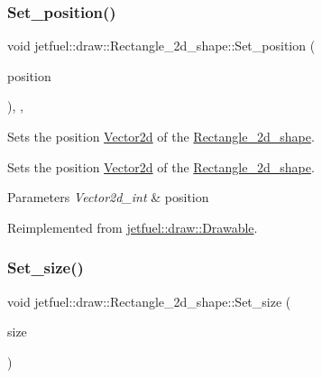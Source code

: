 \subsubsection{\texorpdfstring{Set\+\_\+position()}{Set\_position()}}
{\footnotesize\ttfamily void jetfuel\+::draw\+::\+Rectangle\+\_\+2d\+\_\+shape\+::\+Set\+\_\+position (\begin{DoxyParamCaption}\item[{const \hyperlink{classjetfuel_1_1draw_1_1Vector2d}{Vector2d\+\_\+int}}]{position }\end{DoxyParamCaption})\hspace{0.3cm}{\ttfamily [inline]}, {\ttfamily [override]}, {\ttfamily [virtual]}}



Sets the position \hyperlink{classjetfuel_1_1draw_1_1Vector2d}{Vector2d} of the \hyperlink{classjetfuel_1_1draw_1_1Rectangle__2d__shape}{Rectangle\+\_\+2d\+\_\+shape}. 

Sets the position \hyperlink{classjetfuel_1_1draw_1_1Vector2d}{Vector2d} of the \hyperlink{classjetfuel_1_1draw_1_1Rectangle__2d__shape}{Rectangle\+\_\+2d\+\_\+shape}.


\begin{DoxyParams}{Parameters}
{\em Vector2d\+\_\+int} & position \\
\hline
\end{DoxyParams}


Reimplemented from \hyperlink{classjetfuel_1_1draw_1_1Drawable_afdd035afe40c706459a6c9df813bcce6}{jetfuel\+::draw\+::\+Drawable}.

\mbox{\label{classjetfuel_1_1draw_1_1Rectangle__2d__shape_a27f242564a455d5cd7274e50e5156ffc}} 
\subsubsection{\texorpdfstring{Set\+\_\+size()}{Set\_size()}}
{\footnotesize\ttfamily void jetfuel\+::draw\+::\+Rectangle\+\_\+2d\+\_\+shape\+::\+Set\+\_\+size (\begin{DoxyParamCaption}\item[{const \hyperlink{classjetfuel_1_1draw_1_1Vector2d}{Vector2d\+\_\+int}}]{size }\end{DoxyParamCaption})\hspace{0.3cm}{\ttfamily [inline]}}




